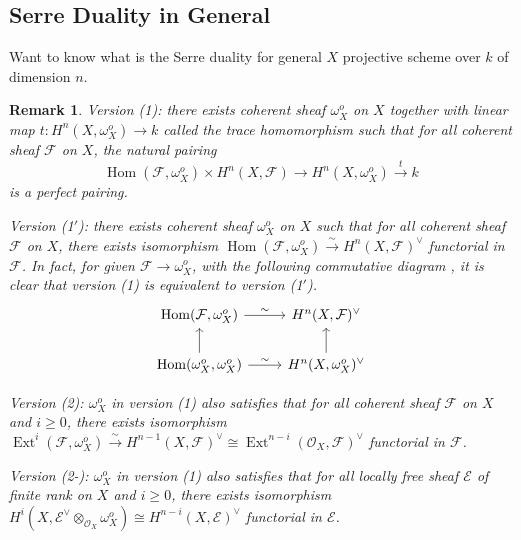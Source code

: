 \documentclass{ctexart}
\newtheorem{remark}{Remark}[section]
\renewcommand{\hom}{\operatorname{Hom}}
\newcommand{\ext}{\operatorname{Ext}}
\begin{document}
\subsection{Serre Duality in General}
\label{subsection:Serre Duality in General}
Want to know what is the Serre duality for general $X$ projective scheme over $k$ of dimension $n$.
\begin{remark}
    Version (1): there exists coherent sheaf $\omega_{X}^{o}$ on $X$ together with linear map $t: H^{n}(X, \omega_{X}^{o}) \longrightarrow k$ called the trace homomorphism such that for all coherent sheaf $\mathcal{F}$ on $X$,
    the natural pairing 
    \begin{equation*}
        \hom(\mathcal{F}, \omega_{X}^{o}) \times H^{n}(X, \mathcal{F}) \longrightarrow H^{n}(X, \omega_{X}^{o}) \overset{t}{\longrightarrow} k
    \end{equation*}
    is a perfect pairing.
    \par
    Version (1$'$): there exists coherent sheaf $\omega_{X}^{o}$ on $X$ such that for all coherent sheaf $\mathcal{F}$ on $X$,
    there exists isomorphism $\hom(\mathcal{F}, \omega_{X}^{o}) \overset{\sim}{\longrightarrow} H^{n}(X, \mathcal{F})^{\lor}$ functorial in $\mathcal{F}$.
    In fact, for given $\mathcal{F} \longrightarrow \omega_{X}^{o}$, with the following commutative diagram , it is clear that version (1) is equivalent to version (1$'$).
    \begin{equation*}
        \begin{tikzcd}
            \hom(\mathcal{F}, \omega_{X}^{o}) \arrow[r, "\sim"] &
            H^{n}(X, \mathcal{F})^{\lor} \\
            \hom(\omega_{X}^{o}, \omega_{X}^{o}) \arrow[u] \arrow[r, "\sim"] &
            H^{n}(X, \omega_{X}^{o})^{\lor} \arrow[u]
        \end{tikzcd}
    \end{equation*}
    \par
    Version (2): $\omega_{X}^{o}$ in version (1) also satisfies that for all coherent sheaf $\mathcal{F}$ on $X$ and $i \ge 0$,
    there exists isomorphism $\ext^{i}(\mathcal{F}, \omega_{X}^{o}) \overset{\sim}{\longrightarrow} H^{n - 1}(X, \mathcal{F})^{\lor} \cong \ext^{n - i}(\mathcal{O}_{X}, \mathcal{F})^{\lor}$ functorial in $\mathcal{F}$.
    \par
    Version (2-): $\omega_{X}^{o}$ in version (1) also satisfies that for all locally free sheaf $\mathcal{E}$ of finite rank on $X$ and $i \ge 0$,
    there exists isomorphism $H^{i}(X, \mathcal{E}^{\lor} \otimes_{\mathcal{O}_{X}} \omega_{X}^{o}) \cong H^{n - i}(X, \mathcal{E})^{\lor}$ functorial in $\mathcal{E}$.

\end{remark}
\end{document}
